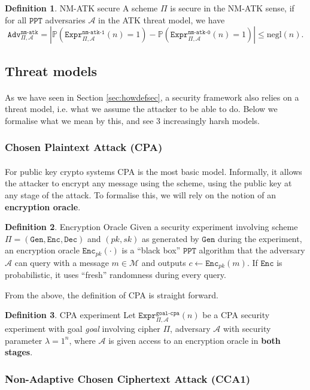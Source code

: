 \documentclass{article}
\theoremstyle{definition}
\newtheorem{definition}{Definition}[section]
\theoremstyle{example}
\newcommand{\Enc}{\texttt{Enc}}
\newcommand{\Dec}{\texttt{Dec}}
\newcommand{\Gen}{\texttt{Gen}}
\newcommand{\M}{\mathcal{M}}
\newcommand{\A}{\mathcal{A}}
\newcommand{\Prob}{\mathbb{P}}
\newcommand{\PPT}{\texttt{PPT}}
\newcommand{\negl}{\text{negl}}
\newcommand{\Expr}[2]{\texttt{Expr}^{\texttt{#1}}_{#2}}
\newcommand{\Adv}[2]{\texttt{Adv}^{\texttt{#1}}_{#2}}
\begin{document}
\begin{definition}{NM-ATK secure}
 A scheme $\Pi$ is secure in the NM-ATK sense, if for all $\PPT$ adversaries
 $\A$ in the ATK threat model, we have
 \[
   \Adv{nm-atk}{\Pi, \A} = |\Prob(\Expr{nm-atk-1}{\Pi, \A}(n) = 1) -
   \Prob(\Expr{nm-atk-0}{\Pi, \A}(n) = 1)| \leq \negl(n).
 \]
\end{definition}
\subsection{Threat models}
\paragraph{} As we have seen in Section \ref{sec:howdefsec}, a security
framework also relies on a threat model, i.e. what we assume the attacker to be
able to do. Below we formalise what we mean by this, and see 3 increasingly
harsh models.
\subsubsection{Chosen Plaintext Attack (CPA)}
\paragraph{} For public key crypto systems CPA is the most basic model.
Informally, it allows the attacker to encrypt any message using the scheme,
using the public key at any stage of the attack. To formalise this, we will rely
on the notion of an \textbf{encryption oracle}.
\begin{definition}{Encryption Oracle}
  Given a security experiment involving scheme $\Pi = (\Gen, \Enc, \Dec)$ and
  $(pk, sk)$ as generated by $\Gen$ during the experiment, an encryption oracle
  $\Enc_{pk}(\cdot)$ is a ``black box'' $\PPT$ algorithm that the adversary $\A$ 
  can query with a message $m\in \M$ and outputs $c \leftarrow \Enc_{pk}(m)$. If
  $\Enc$ is probabilistic, it uses ``fresh'' randomness during every query.
\end{definition}
From the above, the definition of CPA is straight forward.
\begin{definition}{CPA experiment}
  Let $\Expr{goal-cpa}{\Pi, \A}(n)$ be a CPA security experiment with goal
  \textit{goal} involving cipher $\Pi$, adversary $\A$ with security parameter $\lambda = 1^n$, where
  $\A$ is given access to an encryption oracle in \textbf{both stages}.
\end{definition}
\subsubsection{Non-Adaptive Chosen Ciphertext Attack (CCA1)}
\end{document}
